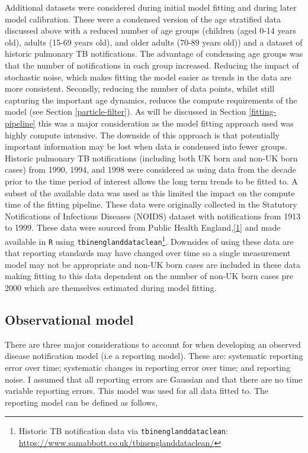 \documentclass[11pt,twoside]{bristolthesis}
\begin{document}
  Additional datasets were considered during initial model fitting and during later model calibration. These were a condensed version of the age stratified data discussed above with a reduced number of age groups (children (aged 0-14 years old), adults (15-69 years old), and older adults (70-89 years old)) and a dataset of historic pulmonary TB notifications. The advantage of condensing age groups was that the number of notifications in each group increased. Reducing the impact of stochastic noise, which makes fitting the model easier as trends in the data are more consistent. Secondly, reducing the number of data points, whilst still capturing the important age dynamics, reduces the compute requirements of the model (see Section \ref{particle-filter}). As will be discussed in Section \ref{fitting-pipeline} this was a major consideration as the model fitting approach used was highly compute intensive. The downside of this approach is that potentially important information may be lost when data is condensed into fewer groups. Historic pulmonary TB notifications (including both UK born and non-UK born cases) from 1990, 1994, and 1998 were considered as using data from the decade prior to the time period of interest allows the long term trends to be fitted to. A subset of the available data was used as this limited the impact on the compute time of the fitting pipeline. These data were originally collected in the Statutory Notifications of Infectious Diseases (NOIDS) dataset with notifications from 1913 to 1999. These data were sourced from Public Health England,{[}\protect\hyperlink{ref-PHE2017}{1}{]} and made available in \texttt{R} using \texttt{tbinenglanddataclean}\footnote{Historic TB notification data via \texttt{tbinenglanddataclean}: \url{https://www.samabbott.co.uk/tbinenglanddataclean/}}. Downsides of using these data are that reporting standards may have changed over time so a single measurement model may not be appropriate and non-UK born cases are included in these data making fitting to this data dependent on the number of non-UK born cases pre 2000 which are themselves estimated during model fitting.
  
  \hypertarget{observational-model}{%
  \subsection{Observational model}\label{observational-model}}
  
  There are three major considerations to account for when developing an observed disease notification model (i.e a reporting model). These are: systematic reporting error over time; systematic changes in reporting error over time; and reporting noise. I assumed that all reporting errors are Gaussian and that there are no time variable reporting errors. This model was used for all data fitted to. The reporting model can be defined as follows,
  
\end{document}
